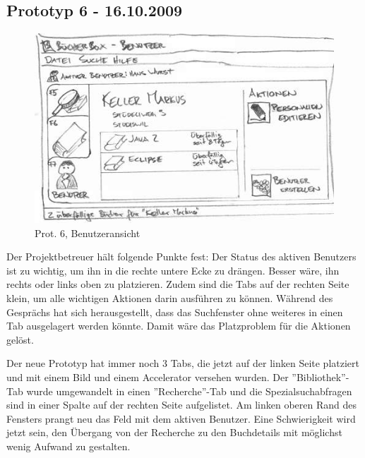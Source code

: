 \documentclass[10pt, a4paper]{scrartcl}
\begin{document}
\subsection{Prototyp 6 - 16.10.2009}
\begin{figure}
  \begin{center}
   \includegraphics{prototyp6Thumbnail} \\
   Prot. 6, Benutzeransicht
  \end{center}
\end{figure}
Der Projektbetreuer hält folgende Punkte fest: Der Status des aktiven Benutzers ist zu wichtig, um ihn in die rechte untere Ecke zu drängen. Besser wäre, ihn rechts oder links oben zu platzieren. Zudem sind die Tabs auf der rechten Seite klein, um alle wichtigen Aktionen darin ausführen zu können. 
Während des Gesprächs hat sich herausgestellt, dass das Suchfenster ohne weiteres in einen Tab ausgelagert werden könnte. Damit wäre das Platzproblem für die Aktionen gelöst. 

Der neue Prototyp hat immer noch 3 Tabs, die jetzt auf der linken Seite platziert und mit einem Bild und einem Accelerator versehen wurden. Der ''Bibliothek''-Tab wurde umgewandelt in einen ''Recherche''-Tab und die Spezialsuchabfragen sind in einer Spalte auf der rechten Seite aufgelistet. Am linken oberen Rand des Fensters prangt neu das Feld mit dem aktiven Benutzer. Eine Schwierigkeit wird jetzt sein, den Übergang von der Recherche zu den Buchdetails mit möglichst wenig Aufwand zu gestalten.
\end{document}
